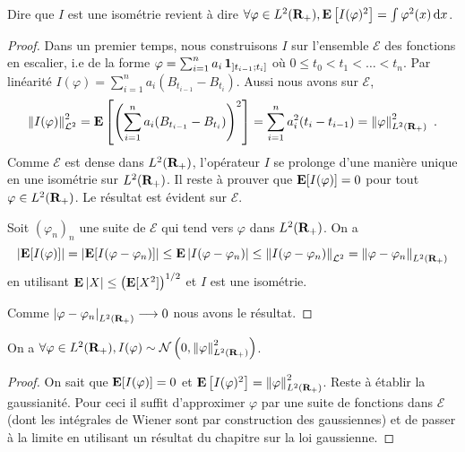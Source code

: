	\begin{rem}
		Dire que $I$ est une isométrie revient à dire $\forall \varphi \in L^2(\mathbf{R}_+), \mathbf{E} \left[ I(\varphi)^2 \right] = \int \varphi^2(x) \mathop{}\mathopen{}\mathrm{d} x$.
	\end{rem}
	
	\begin{proof}
		Dans un premier temps, nous construisons $I$ sur l'ensemble $\mathcal{E}$ des fonctions en escalier, i.e de la forme $\varphi = \sum_{i = 1}^n a_i \operatorname{\mathbf{1}}_{\mathopen{}\mathclose{\left]t_{i-1}\mathclose{}\mathpunct{};t_i\right]}}$ où $0 \leq t_0 < t_1 < \ldots < t_n$.
		Par linéarité $I(\varphi) = \sum_{i = 1}^n a_i \left( B_{t_{i-1}} - B_{t_i} \right)$.
		Aussi nous avons sur $\mathcal{E}$,
		$$\left\lVert I(\varphi)\right\rVert_{\mathcal{L}^2}^2
			= \mathbf{E} \left[ \left( \sum_{i = 1}^n a_i (B_{t_{i-1}} - B_{t_i}) \right)^2 \right]
			= \sum_{i = 1}^n a_i^2 (t_i - t_{i-1})
			= \left\lVert\varphi\right\rVert_{L^2(\mathbf{R}_+)}^2\ .$$
		Comme $\mathcal{E}$ est dense dans $L^2(\mathbf{R}_+)$, l'opérateur $I$ se prolonge d'une manière unique en une isométrie sur $L^2(\mathbf{R}_+)$.
		Il reste à prouver que $\mathbf{E}[I(\varphi)] = 0$ pour tout $\varphi \in L^2(\mathbf{R}_+)$.
		Le résultat est évident sur $\mathcal{E}$.
		
		Soit $(\varphi_n)_n$ une suite de $\mathcal{E}$ qui tend vers $\varphi$ dans $L^2(\mathbf{R}_+)$.
		On a
		$$\left\lvert\mathbf{E}[I(\varphi)]\right\rvert
			= \left\lvert\mathbf{E}[I(\varphi - \varphi_n)]\right\rvert
			\leq \mathbf{E} \left\lvert I(\varphi - \varphi_n)\right\rvert
			\leq \left\lVert I(\varphi - \varphi_n)\right\rVert_{\mathcal{L}^2}
			= \left\lVert\varphi - \varphi_n\right\rVert_{L^2(\mathbf{R}_+)}$$
		en utilisant $\mathbf{E} \left\lvert X\right\rvert \leq \left( \mathbf{E}[X^2] \right)^{1/2}$ et $I$ est une isométrie.
		
		Comme $\left\lvert\varphi - \varphi_n\right\rvert_{L^2(\mathbf{R}_+)} \longrightarrow 0$ nous avons le résultat.
	\end{proof}
	
	\begin{pop}
		On a $\forall \varphi \in L^2(\mathbf{R}_+), I(\varphi) \sim \mathcal{N} \left( 0, \left\lVert\varphi\right\rVert_{L^2(\mathbf{R}_+)}^2 \right)$.
	\end{pop}
	
	\begin{proof}
		On sait que $\mathbf{E}[I(\varphi)] = 0$ et $\mathbf{E} \left[ I(\varphi)^2 \right] = \left\lVert\varphi\right\rVert^2_{L^2(\mathbf{R}_+)}$.
		Reste à établir la gaussianité.
		Pour ceci il suffit d'approximer $\varphi$ par une suite de fonctions dans $\mathcal{E}$ (dont les intégrales de Wiener sont par construction des gaussiennes) et de passer à la limite en utilisant un résultat du chapitre sur la loi gaussienne.
	\end{proof}